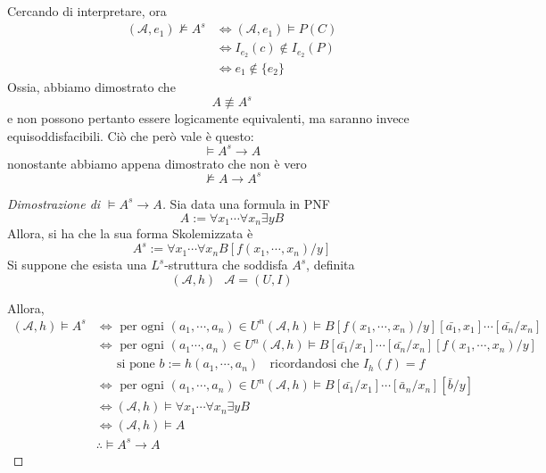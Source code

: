 Cercando di interpretare, ora 
\begin{align*}
        (\mathcal{A}, e_1) \nvDash A^s &\iff (\mathcal{A}, e_1) \models P(C)\\
                                       &\iff I_{e_2}(c) \not\in I_{e_2}(P) \\
                                        &\iff e_1 \not\in \{e_2\}
\end{align*}
Ossia, abbiamo dimostrato che 
$$
A \not\equiv A^s
$$
e non possono pertanto essere logicamente equivalenti, ma saranno invece 
equisoddisfacibili. 
Ciò che però vale è questo: 
$$
\models A^s \rightarrow A
$$
nonostante abbiamo appena dimostrato che non è vero 
$$
\nvDash A \rightarrow A^s
$$
\begin{proof}[Dimostrazione di $\models A^s \rightarrow A$]
        Sia  data una formula in PNF
        $$
        A := \forall x_1 \cdots \forall x_n \exists y B
        $$
        Allora, si ha che la sua forma Skolemizzata è 
        $$
        A^s := \forall x_1 \cdots \forall x_n B[f(x_1, \cdots, x_n)/y]
        $$
        Si suppone che esista una $L^s$-struttura che soddisfa $A^s$, 
        definita 
        $$
        (\mathcal{A}, h) ~~~ \mathcal{A} = (U,I)
        $$

        Allora, 
       \begin{align*}
               (\mathcal{A}, h) \models A^s &\iff \text{ per ogni } (a_1, \cdots, a_n) \in U^n (\mathcal{A}, h)\models B[f(x_1, \cdots, x_n)/y][\bar{a_1},x_1]\cdots[\bar{a_n}/x_n] \\
                                            &\iff \text{ per ogni } (a_1 \cdots, a_n) \in U^n (\mathcal{A}, h) \models B[\bar{a_1}/x_1]\cdots[\bar{a_n}/x_n][f(x_1,\cdots,x_n)/y] \\
                                            & ~~~~~~ \text{ si pone } b := h(a_1, \cdots, a_n) ~~~~ \text{ricordandosi che } I_h(f) = f\\
                                            & \iff \text{ per ogni } (a_1, \cdots, a_n) \in U^n (\mathcal{A}, h) \models B[\bar{a_1}/x_1]\cdots[\bar{a}_n/x_n][\bar{b}/y] \\
                                            &\iff (\mathcal{A}, h) \models \forall x_1 \cdots \forall x_n \exists y B\\
                                            &\iff (\mathcal{A}, h) \models A\\
                                            &\therefore \models A^s \rightarrow A
       \end{align*}
\end{proof}

